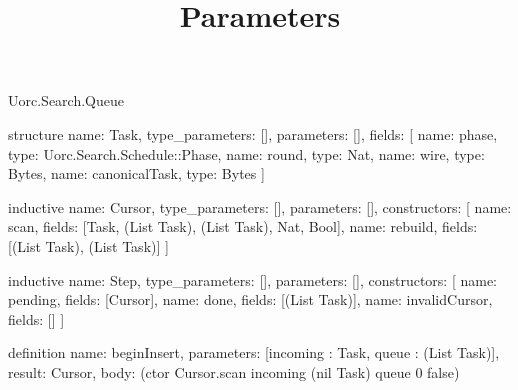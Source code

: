 \begin{lexlean}{Uorc.Search.Queue}
\title{Parameters}
\begin{semanticmodule}
structure{
  name: Task,
  type_parameters: [],
  parameters: [],
  fields: [
    {name: phase, type: Uorc.Search.Schedule::Phase},
    {name: round, type: Nat},
    {name: wire, type: Bytes},
    {name: canonicalTask, type: Bytes}
  ]
}

inductive{
  name: Cursor,
  type_parameters: [],
  parameters: [],
  constructors: [
    {name: scan, fields: [Task, (List Task), (List Task), Nat, Bool]},
    {name: rebuild, fields: [(List Task), (List Task)]}
  ]
}

inductive{
  name: Step,
  type_parameters: [],
  parameters: [],
  constructors: [
    {name: pending, fields: [Cursor]},
    {name: done, fields: [(List Task)]},
    {name: invalidCursor, fields: []}
  ]
}

definition{
  name: beginInsert,
  parameters: [incoming : Task, queue : (List Task)],
  result: Cursor,
  body: (ctor Cursor.scan incoming (nil Task) queue 0 false)
}


\end{semanticmodule}
\end{lexlean}
